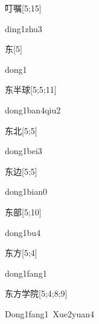 \begin{verbete}{叮嘱}[5;15]
\begin{pronuncia}{ding1zhu3}
\end{pronuncia}
\end{verbete}

\begin{verbete}[dong1]{东}[5]
\begin{pronuncia}{dong1}
\end{pronuncia}
\end{verbete}

\begin{verbete}{东半球}[5;5;11]
\begin{pronuncia}{dong1ban4qiu2}
\end{pronuncia}
\end{verbete}

\begin{verbete}{东北}[5;5]
\begin{pronuncia}{dong1bei3}
\end{pronuncia}
\end{verbete}

\begin{verbete}{东边}[5;5]
\begin{pronuncia}{dong1bian0}
\end{pronuncia}
\end{verbete}

\begin{verbete}[dong1bu4]{东部}[5;10]
\begin{pronuncia}{dong1bu4}
\end{pronuncia}
\end{verbete}

\begin{verbete}{东方}[5;4]
\begin{pronuncia}{dong1fang1}
\end{pronuncia}
\end{verbete}

\begin{verbete}{东方学院}[5;4;8;9]
\begin{pronuncia}[\\]{Dong1fang1\ Xue2yuan4}
\end{pronuncia}
\end{verbete}

